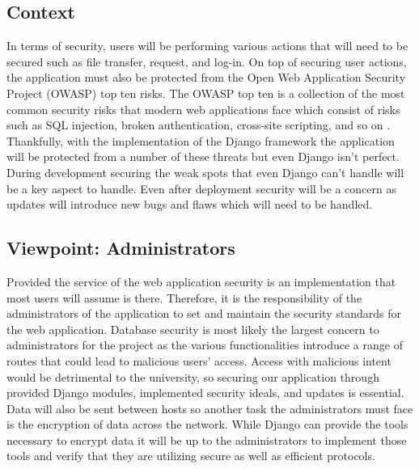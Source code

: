 \documentclass[onecolumn, draftclsnofoot,10pt, compsoc]{IEEEtran}
\begin{document}
\subsection{Context}   
In terms of security, users will be performing various actions that will need to be secured such as file transfer, request, and log-in. On top of securing user actions, the application must also be protected from the Open Web Application Security Project (OWASP) top ten risks. The OWASP top ten is a collection of the most common security risks that modern web applications face which consist of risks such as SQL injection, broken authentication, cross-site scripting, and so on \cite{owasp}. Thankfully, with the implementation of the Django framework the application will be protected from a number of these threats but even Django isn’t perfect. During development securing the weak spots that even Django can’t handle will be a key aspect to handle. Even after deployment security will be a concern as updates will introduce new bugs and flaws which will need to be handled. 

\subsection{Viewpoint: Administrators}
Provided the service of the web application security is an implementation that most users will assume is there. Therefore, it is the responsibility of the administrators of the application to set and maintain the security standards for the web application. Database security is most likely the largest concern to administrators for the project as the various functionalities introduce a range of routes that could lead to malicious users’ access. Access with malicious intent would be detrimental to the university, so securing our application through provided Django modules, implemented security ideals, and updates is essential. Data will also be sent between hosts so another task the administrators must face is the encryption of data across the network. While Django can provide the tools necessary to encrypt data it will be up to the administrators to implement  those tools and verify that they are utilizing secure as well as efficient protocols. 
\end{document}
